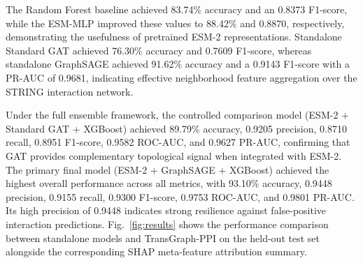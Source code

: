 \documentclass[conference]{IEEEtran}
\begin{document}
\begin{table}[htbp]
\caption{Performance Comparison of Evaluated Models on the Untouched Test Set (20,172 Pairs)}
\label{tab:performance}
\centering
{}
\end{table}

The Random Forest baseline achieved 83.74\% accuracy and an 0.8373 F1-score,
while the ESM-MLP improved these values to 88.42\% and 0.8870, respectively,
demonstrating the usefulness of pretrained ESM-2 representations. Standalone
Standard GAT achieved 76.30\% accuracy and 0.7609 F1-score, whereas standalone
GraphSAGE achieved 91.62\% accuracy and a 0.9143 F1-score with a PR-AUC of 0.9681,
indicating effective neighborhood feature aggregation over the STRING interaction network.

Under the full ensemble framework, the controlled comparison model (ESM-2 + Standard GAT + XGBoost)
achieved 89.79\% accuracy, 0.9205 precision, 0.8710 recall, 0.8951 F1-score, 0.9582 ROC-AUC, and 0.9627 PR-AUC,
confirming that GAT provides complementary topological signal when integrated with ESM-2.
The primary final model (ESM-2 + GraphSAGE + XGBoost) achieved the highest overall performance across all
metrics, with 93.10\% accuracy, 0.9448 precision, 0.9155 recall, 0.9300 F1-score, 0.9753 ROC-AUC,
and 0.9801 PR-AUC. Its high precision of 0.9448 indicates strong resilience against false-positive
interaction predictions.
Fig.~\ref{fig:results} shows the performance comparison between standalone models and TransGraph-PPI on the held-out test set alongside the corresponding SHAP meta-feature attribution summary.
\end{document}
